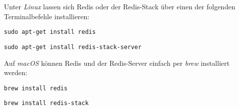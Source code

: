 Unter \textit{Linux} lassen sich \ac{Redis} oder der \ac{Redis}-Stack über einen der folgenden Terminalbefehle installieren:

\texttt{sudo apt-get install redis}

\texttt{sudo apt-get install redis-stack-server}

\vspace{0.4cm}

Auf \textit{macOS} können \ac{Redis} und der \ac{Redis}-Server einfach per \textit{brew} installiert werden:

\texttt{brew install redis}

\texttt{brew install redis-stack}

\vspace{0.4cm}



